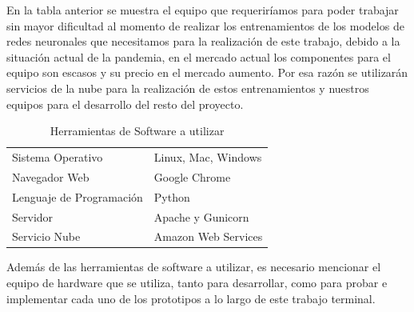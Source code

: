 \documentclass[12pt, a4paper, titlepage]{report}
\begin{document}
    	En la tabla anterior se muestra el equipo que requeriríamos para poder trabajar sin mayor dificultad al momento de realizar los entrenamientos de los modelos de redes neuronales que necesitamos para la realización de este trabajo, debido a la situación actual de la pandemia, en el mercado actual los componentes para el equipo son escasos y su precio en el mercado aumento. Por esa razón se utilizarán servicios de la nube para la realización de estos entrenamientos y nuestros equipos para el desarrollo del resto del proyecto.
    	
    	\begin{table}[H]
    		\begin{tabular}{ |p{3.5cm}|p{9.5cm}|}
    			\hline
    			\rowcolor{guindapoli}
    			\multicolumn{2}{|c|}{\textbf{\textcolor{white}{Herramientas de Software a utilizar}}}\\
    			\hline
    			\cellcolor{azulclaro}Sistema Operativo & 
    			Linux, Mac, Windows \\ 
    			\hline
    			\cellcolor{azulclaro}Navegador Web &
    			Google Chrome\\
    			\hline
    			\cellcolor{azulclaro}Lenguaje de Programaci\'on &
    			Python\\
    			\hline
    			\cellcolor{azulclaro}Servidor &
    			Apache y Gunicorn\\
    			\hline
    			\cellcolor{azulclaro}Servicio Nube &
    			Amazon Web Services\\
    			\hline    			
    		\end{tabular}
    		\caption[Herramientas de Software]{Herramientas de Software a utilizar}
    	\end{table}
    
    	Además de las herramientas de software a utilizar, es necesario mencionar el equipo de hardware que se utiliza, tanto para desarrollar, como para probar e implementar cada uno de los prototipos a lo largo de este trabajo terminal.
    	
\end{document}
